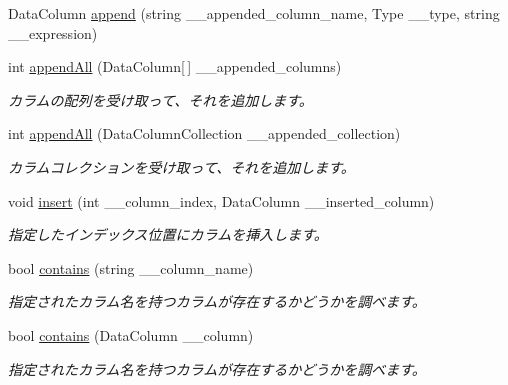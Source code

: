 \begin{DoxyCompactItemize}
\item 
DataColumn \hyperlink{classlazurite_1_1pattern_1_1building_1_1_data_column_builder_a86a98b1af1ae16dc1b7944575b328521}{append} (string \_\-\_\-appended\_\-column\_\-name, Type \_\-\_\-type, string \_\-\_\-expression)
\item 
int \hyperlink{classlazurite_1_1pattern_1_1building_1_1_data_column_builder_a67f27556356cd162a8c1d4054156389a}{appendAll} (DataColumn\mbox{[}$\,$\mbox{]} \_\-\_\-appended\_\-columns)
\begin{DoxyCompactList}\small\item\em カラムの配列を受け取って、それを追加します。 \item\end{DoxyCompactList}\item 
int \hyperlink{classlazurite_1_1pattern_1_1building_1_1_data_column_builder_ab10387e649e0b7adf345ab094c80b3ae}{appendAll} (DataColumnCollection \_\-\_\-appended\_\-collection)
\begin{DoxyCompactList}\small\item\em カラムコレクションを受け取って、それを追加します。 \item\end{DoxyCompactList}\item 
void \hyperlink{classlazurite_1_1pattern_1_1building_1_1_data_column_builder_a6d6a28d827fc717ad999c558a2768f63}{insert} (int \_\-\_\-column\_\-index, DataColumn \_\-\_\-inserted\_\-column)
\begin{DoxyCompactList}\small\item\em 指定したインデックス位置にカラムを挿入します。 \item\end{DoxyCompactList}\item 
bool \hyperlink{classlazurite_1_1pattern_1_1building_1_1_data_column_builder_adf06a9ec9233dced167f5f77d3294148}{contains} (string \_\-\_\-column\_\-name)
\begin{DoxyCompactList}\small\item\em 指定されたカラム名を持つカラムが存在するかどうかを調べます。 \item\end{DoxyCompactList}\item 
bool \hyperlink{classlazurite_1_1pattern_1_1building_1_1_data_column_builder_a5cd5878bc0681458b8800c1f066567bc}{contains} (DataColumn \_\-\_\-column)
\begin{DoxyCompactList}\small\item\em 指定されたカラム名を持つカラムが存在するかどうかを調べます。 \item\end{DoxyCompactList}\item 

\end{DoxyCompactItemize}
